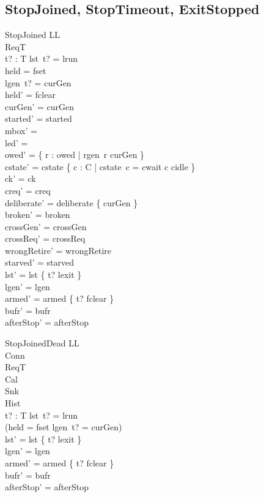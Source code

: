 \documentclass[a4paper,10pt,fleqn]{article}
\begin{document}
\subsection{StopJoined, StopTimeout, ExitStopped}

\begin{schema}{StopJoined}
  \Delta LL \\
  \Xi ReqT \\
  t? : T
\where
  lst~t? = lrun \\
  held = fset \\
  lgen~t? = curGen \\
  held' = fclear \\
  curGen' = curGen \\
  started' = started \\
  mbox' = \emptyset \\
  led' = \emptyset \\
  owed' = \{ r : owed | rgen~r \neq curGen \} \\
  cstate' = cstate \oplus \{ c : C | cstate~c = cwait \spot c \mapsto cidle \} \\
  ck' = ck \\
  creq' = creq \\
  deliberate' = deliberate \cup \{ curGen \} \\
  broken' = broken \\
  crossGen' = crossGen \\
  crossReq' = crossReq \\
  wrongRetire' = wrongRetire \\
  starved' = starved \\
  lst' = lst \oplus \{ t? \mapsto lexit \} \\
  lgen' = lgen \\
  armed' = armed \oplus \{ t? \mapsto fclear \} \\
  bufr' = bufr \\
  afterStop' = afterStop
\end{schema}

\begin{schema}{StopJoinedDead}
  \Delta LL \\
  \Xi Conn \\
  \Xi ReqT \\
  \Xi Cal \\
  \Xi Snk \\
  \Xi Hist \\
  t? : T
\where
  lst~t? = lrun \\
  \lnot (held = fset \land lgen~t? = curGen) \\
  lst' = lst \oplus \{ t? \mapsto lexit \} \\
  lgen' = lgen \\
  armed' = armed \oplus \{ t? \mapsto fclear \} \\
  bufr' = bufr \\
  afterStop' = afterStop
\end{schema}
\end{document}
